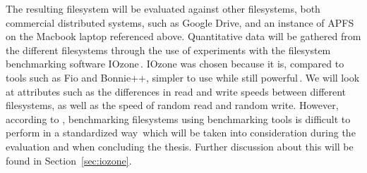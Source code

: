 The resulting filesystem will be evaluated against other filesystems, both commercial distributed systems, such as Google Drive, and an instance of \gls{APFS}\,\cite{appleinc.AppleFileSystem} on the Macbook laptop referenced above. Quantitative data will be gathered from the different filesystems through the use of experiments with the filesystem benchmarking software IOzone\,\cite{IozoneFilesystemBenchmark}. IOzone was chosen because it is, compared to tools such as Fio and Bonnie++, simpler to use while still powerful\,\cite{agarwalComparingIOBenchmarks2018}. We will look at attributes such as the differences in read and write speeds between different filesystems, as well as the speed of random read and random write. However, according to \citeauthor{tarasovBenchmarkingFileSystem2011}, benchmarking filesystems using benchmarking tools is difficult to perform in a standardized way\,\cite{tarasovBenchmarkingFileSystem2011} which will be taken into consideration during the evaluation and when concluding the thesis. Further discussion about this will be found in Section~\ref{sec:iozone}.

